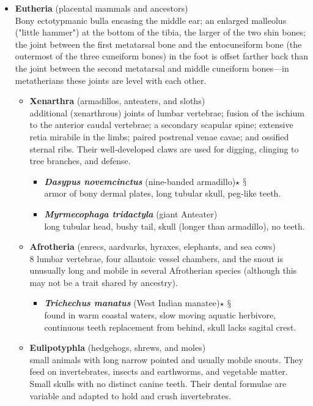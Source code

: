 \documentclass[a4paper,12pt]{article}
\begin{document}
\begin{description}
\begin{itemize}
\begin{itemize}
      \end{itemize}      
  \item{\textbf{Eutheria} (placental mammals and ancestors)} \\ Bony ectotypmanic bulla encasing the middle ear; an enlarged malleolus ("little hammer") at the bottom of the tibia, the larger of the two shin bones; the joint between the first metatarsal bone and the entocuneiform bone (the outermost of the three cuneiform bones) in the foot is offset farther back than the joint between the second metatarsal and middle cuneiform bones—in metatherians these joints are level with each other.
  \begin{itemize}
    \item{\textbf{Xenarthra} (armadillos, anteaters, and sloths)} \\ additional (xenarthrous) joints of lumbar vertebrae; fusion of the ischium to the anterior caudal vertebrae; a secondary scapular spine; extensive retia mirabile in the limbs; paired postrenal venae cavae; and ossified sternal ribs. Their well-developed claws are used for digging, clinging to tree branches, and defense.
    \begin{itemize}
      \item{\textbf{\textit{Dasypus novemcinctus}} (nine-banded armadillo)$\star$ $\mathsection$} \\ armor of bony dermal plates, long tubular skull, peg-like teeth.
      \item{\textbf{\textit{Myrmecophaga tridactyla}} (giant Anteater)} \\ long tubular head, bushy tail, skull (longer than armadillo), no teeth.
    \end{itemize}
    \item{\textbf{Afrotheria} (enrecs, aardvarks, hyraxes, elephants, and sea cows)} \\ 8 lumbar vertebrae, four allantoic vessel chambers, and the snout is unusually long and mobile in several Afrotherian species (although this may not be a trait shared by ancestry).
    \begin{itemize}
      \item{\textbf{\textit{Trichechus manatus}} (West Indian manatee)$\star$ $\mathsection$} \\ found in warm coastal waters, slow moving aquatic herbivore, continuous teeth replacement from behind, skull lacks sagital crest.
    \end{itemize}
    \item{\textbf{Eulipotyphla} (hedgehogs, shrews, and moles)} \\ small animals with long narrow pointed and usually mobile snouts. They feed on invertebrates, insects and earthworms, and vegetable matter. Small skulls with no distinct canine teeth. Their dental formulae are variable and adapted to hold and crush invertebrates.

\end{itemize}
\end{itemize}
\end{description}
\end{document}

